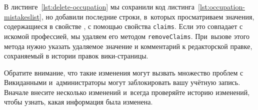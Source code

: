 
В листинге~\ref{lst:delete-occupation} 
мы сохранили код листинга~\ref{lst:occupation-mistakeslist}, 
но добавили последние строки, 
в~которых просматриваем значения, содержащиеся в свойстве , 
с помощью свойства \mbox{\lstinline|claims|.} 
Если это совпадает с искомой профессией, мы удаляем его методом \mbox{\lstinline|removeClaims|.} 
При~вызове этого метода нужно указать удаляемое значение и комментарий к редакторской правке, сохраняемый в истории правок вики-страницы.


Обратите внимание, 
что такие изменения могут вызвать множество проблем с Викиданными 
и~администраторы могут заблокировать вашу учётную запись. 
Вначале внесите несколько изменений и~всегда проверяйте историю изменений, 
чтобы узнать, какая информация была изменена.






\makeatletter
\long{}%
\makeatother
